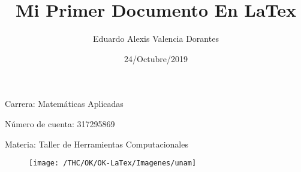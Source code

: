 \documentclass{article}%
\title{Mi Primer Documento En LaTex}
\author{Eduardo Alexis Valencia Dorantes}
\date{24/Octubre/2019}
\begin{document}
	\begin{titlepage}
		\maketitle
	\end{titlepage}

Carrera: Matemáticas Aplicadas

Número de cuenta: 317295869

Materia: Taller de Herramientas Computacionales
\vfill

\begin{figure}
	\centering
	\texttt{[image: /THC/OK/OK-LaTex/Imagenes/unam]}
	\caption{}
	\label{fig:unam}
\end{figure}
\end{document}
